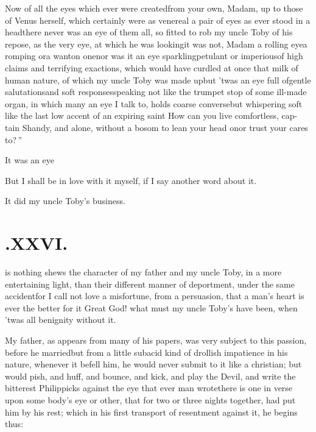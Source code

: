 \documentclass{article}
\begin{document}
Now of all the eyes which ever were created\tsh from
your own, Madam, up to those of Venus herself, which
certainly were as venereal a pair of eyes as ever stood in a
head\tsh there never was an eye of them all, so fitted to
rob my uncle Toby of his repose, as the very eye, at which
he was looking\tsh it was not, Madam a rolling
eye\tsh a romping or\break a wanton one\tsk nor was it an eye
spark\-ling\tsk petulant or imperious\tsk of high claims and
terrifying exactions, which would have curdled at once that milk of human
nature, of which my uncle Toby was made up\tsh but
’twas an eye full of\break gentle salutations\tsh and soft
responses\break\tsh speaking \tsh not like the trumpet\break
stop of some ill-made organ, in which many an eye I talk to, holds
coarse converse\tsh but whispering soft \tsh like
the last low accent of an expiring
saint\tsh\break 
\lqq How can you live comfortless, cap-\break
\lqq tain Shandy, and alone, without a\break
\lqq bosom to lean your head on\tsh or\break
\lqq trust your cares to?\,”

It was an eye\tsh

But I shall be in love with it myself,\break
if I say another word about it.

\tsh It did my uncle Toby’s business.

\section{.\enspace XXVI.}

 is nothing shews the cha\-racter
of my father and my uncle Toby, in a more entertaining
light, than their different manner of deportment, under the same
accident\tsh for I call not love a misfortune, from a
persuasion, that a man’s heart is ever the better for
it\break
\tsh Great God! what must my uncle Toby’s
have been, when ’twas all benignity without it.

My father, as appears from many of his papers, was very subject
to this passion, before he married\tsh but from a little
subacid kind of drollish impatience in his nature, whenever it
befell him, he would never submit to it like a christian; but would
pish, and huff, and bounce, and kick, and play the Devil, and write
the bitterest Philippicks against the eye that ever man
wrote\tsh there is one in verse upon some body’s eye
or other, that for two or three nights together, had put him by his
rest; which in his first transport of resentment against it, he
begins thus:
\end{document}
